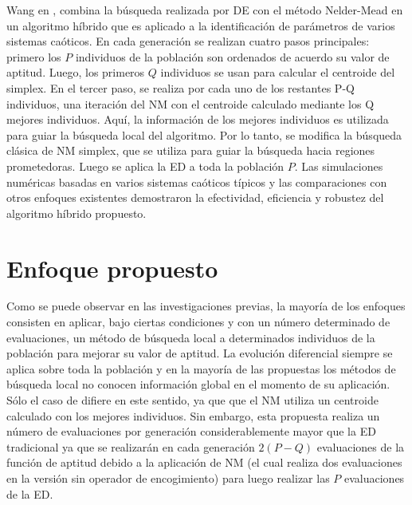 Wang en \cite{wang2011parameter}, combina la búsqueda realizada por DE con el método Nelder-Mead  en un algoritmo híbrido que es aplicado a la identificación de parámetros de varios sistemas caóticos. En cada generación se realizan cuatro pasos principales: primero los $P$ individuos de la población son ordenados de acuerdo su valor de aptitud. Luego, los primeros $Q$ individuos se usan para calcular el centroide del simplex. En el tercer paso, se realiza por cada uno de los restantes P-Q individuos, una iteración del NM con el centroide calculado mediante los Q mejores individuos. Aquí, la información de los mejores individuos es utilizada para guiar la búsqueda local del algoritmo. Por lo tanto, se modifica la búsqueda clásica de NM simplex, que se utiliza para guiar la búsqueda hacia regiones prometedoras. Luego se aplica la ED a toda la población $P$. Las simulaciones numéricas basadas en varios sistemas caóticos típicos y las comparaciones con otros enfoques existentes demostraron la efectividad, eficiencia y robustez del algoritmo híbrido propuesto. 



\section{Enfoque propuesto}\label{sec:Enfoque propuesto}
Como se puede observar en las investigaciones previas, la mayoría de los enfoques consisten en aplicar, bajo ciertas condiciones y con un número determinado de evaluaciones,  un método de búsqueda local a determinados individuos de la población para mejorar su valor de aptitud. La evolución diferencial siempre se aplica sobre toda la población y en la mayoría de las propuestas los métodos de búsqueda local no conocen información global en el momento de su aplicación. Sólo el caso de \cite{wang2011parameter} difiere en este sentido, ya que que el NM utiliza un centroide calculado con los mejores individuos. Sin embargo, esta propuesta realiza un número de evaluaciones por generación considerablemente mayor que la ED tradicional ya que se realizarán en cada generación $2(P-Q)$ evaluaciones de la función de aptitud debido a la aplicación de NM (el cual realiza dos evaluaciones en la versión sin operador de encogimiento) para luego realizar las $P$ evaluaciones de la ED. 


